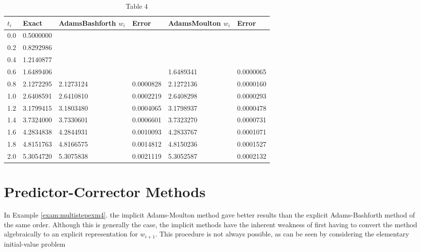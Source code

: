 \begin{table}
\centering
\begin{tabular}{|l|l|l|l|l|l|}
\hline
$t_{i}$ & Exact & AdamsBashforth $w_{i}$ & Error & AdamsMoulton $w_{i}$ & Error \\
\hline
0.0 & 0.5000000 &  &  &  &  \\
\hline
0.2 & 0.8292986 &  &  &  &  \\
\hline
0.4 & 1.2140877 &  &  &  &  \\
\hline
0.6 & 1.6489406 &  &  & 1.6489341 & 0.0000065 \\
\hline
0.8 & 2.1272295 & 2.1273124 & 0.0000828 & 2.1272136 & 0.0000160 \\
\hline
1.0 & 2.6408591 & 2.6410810 & 0.0002219 & 2.6408298 & 0.0000293 \\
\hline
1.2 & 3.1799415 & 3.1803480 & 0.0004065 & 3.1798937 & 0.0000478 \\
\hline
1.4 & 3.7324000 & 3.7330601 & 0.0006601 & 3.7323270 & 0.0000731 \\
\hline
1.6 & 4.2834838 & 4.2844931 & 0.0010093 & 4.2833767 & 0.0001071 \\
\hline
1.8 & 4.8151763 & 4.8166575 & 0.0014812 & 4.8150236 & 0.0001527 \\
\hline
2.0 & 5.3054720 & 5.3075838 & 0.0021119 & 5.3052587 & 0.0002132 \\
\hline
\end{tabular}
\caption{\scriptsize Table $4$}
\label{tab:multistepexm3}
\end{table}

%
%
%

\section*{Predictor-Corrector Methods}
In Example \ref{exam:multistepexm4}. the implicit Adams-Moulton method gave better results than the explicit Adams-Bashforth method of the same order. Although this is generally the case, the implicit methods have the inherent weakness of first having to convert the method algebraically to an explicit representation for $w_{i+1}$. This procedure is not always possible, as can be seen by considering the elementary initial-value problem

